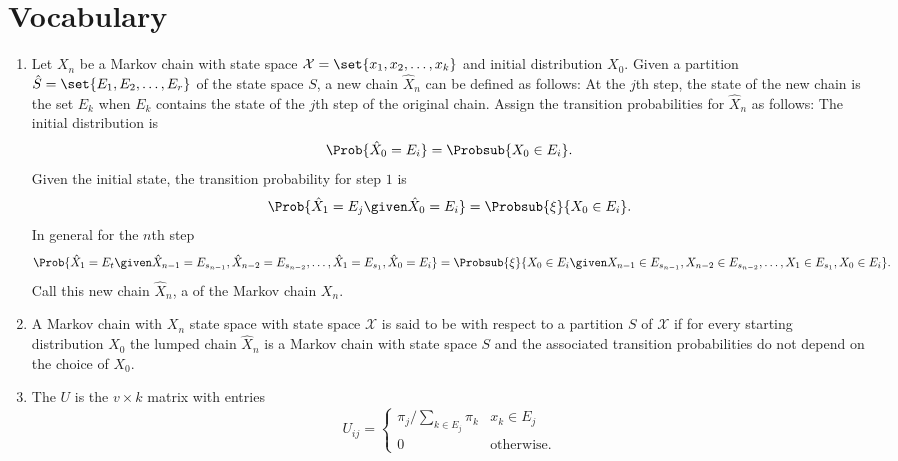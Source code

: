 \documentclass[12pt]{article}
\begin{document}
\section*{Vocabulary}
\begin{enumerate}
    \item
        Let \( X_n \) be a Markov chain with state space \( \mathcal{X}
        = \set{x_1, x_2, \dots, x_k} \) and initial distribution \( X_0 \).
        Given a partition \( \hat{S} = \set{E_1, E_2, \dots, E_r} \) of
        the state space \( S \), a new chain \( \hat{X}_n \) can be
        defined as follows:  At the \( j \)th step, the state of the new
        chain is the set \( E_k \) when \( E_k \) contains the state of
        the \( j \)th step of the original chain.  Assign the transition
        probabilities for \( \hat{X}_n \) as follows: The initial
        distribution is
        \[
            \Prob{\hat{X}_0 = E_i} = \Probsub{X_0 \in E_i}.
        \] Given the initial state, the transition probability for step \(
        1 \) is
        \[
            \Prob{\hat{X}_1 = E_j \given \hat{X}_0 = E_i} = \Probsub{\xi}
            {X_0 \in E_i }.
        \] In general for the \( n \)th step
        \[
            \Prob{\hat{X}_1 = E_t \given \hat{X}_{n-1} = E_{s_{n-1}},
            \hat{X}_{n-2} = E_{s_{n-2}}, \dots, \hat{X}_1 = E_{s_1},
            \hat{X}_0 = E_i} = \Probsub{\xi}{X_0 \in E_i \given X_{n-1}
            \in E_{s_{n-1}}, X_{n-2} \in E_{s_{n-2}}, \dots, X_1 \in E_{s_1},
            X_0 \in E_i}.
        \] Call this new chain \( \hat{X}_n \), a %
        of the Markov chain \( X_n \).
    \item
        A Markov chain with \( X_n \) state space with state space \(
        \mathcal{X} \) is said to be %
        with respect to a partition \( S \) of \( \mathcal{X} \) if for
        every starting distribution \( X_0 \) the lumped chain \( \hat{X}_n
        \) is a Markov chain with state space \( S \) and the associated
        transition probabilities do not depend on the choice of \( X_0 \).
    \item
        The %
        \( U \) is the \( v \times k \) matrix with entries
        \[
            U_{ij} =
            \begin{cases}
                \pi_j/\sum_{k \in E_j} \pi_k & x_k \in E_j \\
                0 & \text{otherwise}.
            \end{cases}
\]
\end{enumerate}
\end{document}
